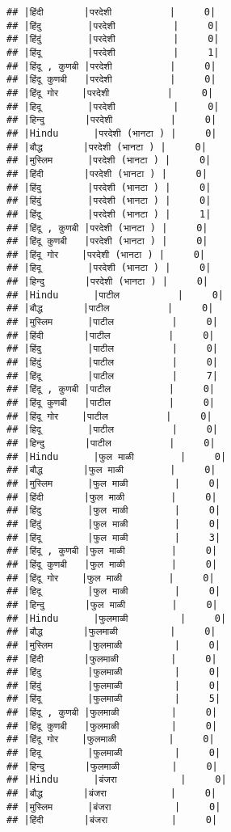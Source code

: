 \documentclass[
]{article}
\begin{document}
\begin{verbatim}
## |हिंदी       |परदेशी          |     0|
## |हिंदु        |परदेशी          |     0|
## |हिंदुं        |परदेशी          |     0|
## |हिंदू        |परदेशी          |     1|
## |हिंदू , कुणबी |परदेशी          |     0|
## |हिंदू कुणबी   |परदेशी          |     0|
## |हिंदू गोर    |परदेशी          |     0|
## |हिदू        |परदेशी          |     0|
## |हिन्दु       |परदेशी          |     0|
## |Hindu      |परदेशी (भानटा ) |     0|
## |बौद्ध       |परदेशी (भानटा ) |     0|
## |मुस्लिम      |परदेशी (भानटा ) |     0|
## |हिंदी       |परदेशी (भानटा ) |     0|
## |हिंदु        |परदेशी (भानटा ) |     0|
## |हिंदुं        |परदेशी (भानटा ) |     0|
## |हिंदू        |परदेशी (भानटा ) |     1|
## |हिंदू , कुणबी |परदेशी (भानटा ) |     0|
## |हिंदू कुणबी   |परदेशी (भानटा ) |     0|
## |हिंदू गोर    |परदेशी (भानटा ) |     0|
## |हिदू        |परदेशी (भानटा ) |     0|
## |हिन्दु       |परदेशी (भानटा ) |     0|
## |Hindu      |पाटील          |     0|
## |बौद्ध       |पाटील          |     0|
## |मुस्लिम      |पाटील          |     0|
## |हिंदी       |पाटील          |     0|
## |हिंदु        |पाटील          |     0|
## |हिंदुं        |पाटील          |     0|
## |हिंदू        |पाटील          |     7|
## |हिंदू , कुणबी |पाटील          |     0|
## |हिंदू कुणबी   |पाटील          |     0|
## |हिंदू गोर    |पाटील          |     0|
## |हिदू        |पाटील          |     0|
## |हिन्दु       |पाटील          |     0|
## |Hindu      |फुल माळी        |     0|
## |बौद्ध       |फुल माळी        |     0|
## |मुस्लिम      |फुल माळी        |     0|
## |हिंदी       |फुल माळी        |     0|
## |हिंदु        |फुल माळी        |     0|
## |हिंदुं        |फुल माळी        |     0|
## |हिंदू        |फुल माळी        |     3|
## |हिंदू , कुणबी |फुल माळी        |     0|
## |हिंदू कुणबी   |फुल माळी        |     0|
## |हिंदू गोर    |फुल माळी        |     0|
## |हिदू        |फुल माळी        |     0|
## |हिन्दु       |फुल माळी        |     0|
## |Hindu      |फुलमाळी         |     0|
## |बौद्ध       |फुलमाळी         |     0|
## |मुस्लिम      |फुलमाळी         |     0|
## |हिंदी       |फुलमाळी         |     0|
## |हिंदु        |फुलमाळी         |     0|
## |हिंदुं        |फुलमाळी         |     0|
## |हिंदू        |फुलमाळी         |     5|
## |हिंदू , कुणबी |फुलमाळी         |     0|
## |हिंदू कुणबी   |फुलमाळी         |     0|
## |हिंदू गोर    |फुलमाळी         |     0|
## |हिदू        |फुलमाळी         |     0|
## |हिन्दु       |फुलमाळी         |     0|
## |Hindu      |बंजरा           |     0|
## |बौद्ध       |बंजरा           |     0|
## |मुस्लिम      |बंजरा           |     0|
## |हिंदी       |बंजरा           |     0|

\end{verbatim}
\end{document}
